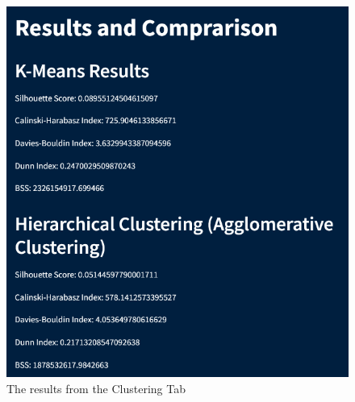 \documentclass[unnumsec,webpdf,contemporary,large]{oup-authoring-template}%
\theoremstyle{thmstyleone}%
\theoremstyle{thmstyletwo}%
\theoremstyle{thmstylethree}%
\begin{document}
\begin{figure}
    \centering
    \includegraphics[width=1\linewidth]{images/clustering-resultsfinal.png}
    \caption{The results from the Clustering Tab}
    \label{fig:clustering-results}
\end{figure}
\end{document}
